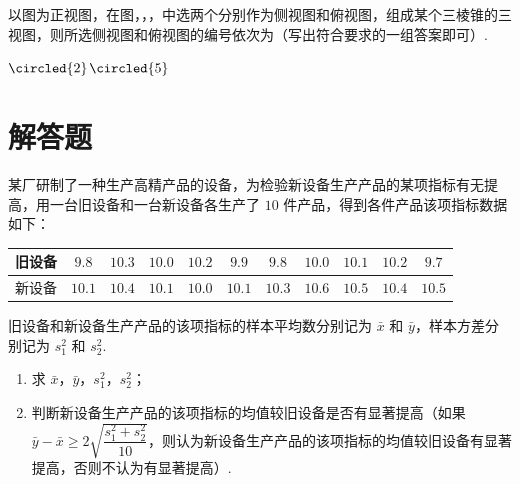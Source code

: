 \begin{problem}
以图为正视图，在图，，，中选两个分别作为侧视图和俯视图，组成某个三棱锥的三视图，则所选侧视图和俯视图的编号依次为\fillinblank{}（写出符合要求的一组答案即可）.

\end{problem}

\begin{answer}
\(\circled{2}\)\(\circled{5}\)
\end{answer}

\section{解答题}

\begin{problem}
某厂研制了一种生产高精产品的设备，为检验新设备生产产品的某项指标有无提高，用一台旧设备和一台新设备各生产了 \(10\) 件产品，得到各件产品该项指标数据如下：

\begin{center}
\begin{tabular}{|c|*{10}{c|}}
\hline
旧设备 & \(9.8\) & \(10.3\) & \(10.0\) & \(10.2\) & \(9.9\) & \(9.8\) & \(10.0\) & \(10.1\) & \(10.2\) & \(9.7\) \\
\hline
新设备 & \(10.1\) & \(10.4\) & \(10.1\) & \(10.0\) & \(10.1\) & \(10.3\) & \(10.6\) & \(10.5\) & \(10.4\) & \(10.5\) \\
\hline
\end{tabular}
\end{center}

旧设备和新设备生产产品的该项指标的样本平均数分别记为 \(\bar{x}\) 和 \(\bar{y}\)，样本方差分别记为 \(s_1^2\) 和 \(s_2^2\).

\begin{enumerate}
\item 求 \(\bar{x}\)，\(\bar{y}\)，\(s_1^2\)，\(s_2^2\)；
\item 判断新设备生产产品的该项指标的均值较旧设备是否有显著提高（如果 \(\bar{y}-\bar{x}\ge2\sqrt{\dfrac{s_1^2+s_2^2}{10}}\)，则认为新设备生产产品的该项指标的均值较旧设备有显著提高，否则不认为有显著提高）.
\end{enumerate}
\end{problem}


